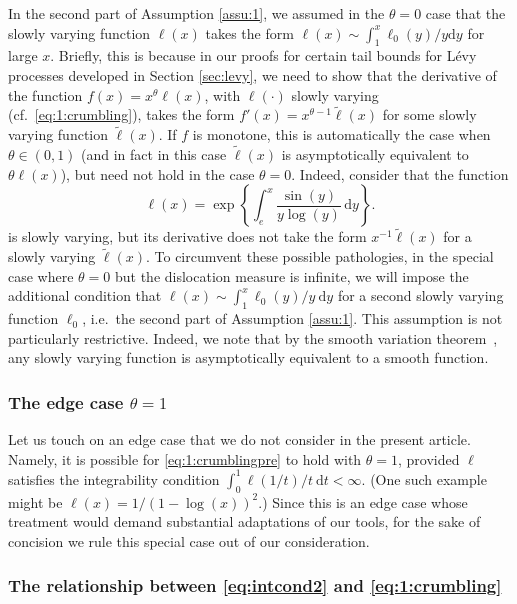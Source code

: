 \documentclass[a4,12pt]{amsart}
\numberwithin{equation}{section}
\begin{document}
    In the second part of Assumption \ref{assu:1}, we assumed in the $\theta =0$ case that the slowly varying function $\ell(x)$ takes the form $\ell(x) \sim \int_1^x \ell_0(y)/y \mathrm{d}y$ for large $x$. Briefly, this is because in our proofs for certain tail bounds for L\'evy processes developed in Section \ref{sec:levy}, we need to show that the derivative of the function $f(x) = x^\theta \ell(x)$, with $\ell(\cdot)$ slowly varying (cf.\ \eqref{eq:1:crumbling}), takes the form $f'(x) = x^{\theta-1} \tilde{\ell}(x)$ for some slowly varying function $\tilde{\ell}(x)$. If $f$ is monotone, this is automatically the case when $\theta \in (0,1)$ (and in fact in this case $\tilde{\ell}(x)$ is asymptotically equivalent to $\theta\ell(x)$), but need not hold in the case $\theta = 0$. Indeed, consider that the function  	
    \[
        \ell(x) = \exp\left\{ \int_e^x \frac{\sin(y)}{y \log(y)} \, \mathrm{d}y \right\}.
	\]
    is slowly varying, but its derivative does not take the form $x^{-1}\tilde{\ell}(x)$ for a slowly varying $\tilde{\ell}(x)$. To circumvent these possible pathologies, in the special case where $\theta = 0$ but the dislocation measure is infinite, 
	we will impose the additional condition that $\ell(x) \sim \int_1^x \ell_0(y)/y ~\mathrm{d}y$ for a second slowly varying function $\ell_0$, i.e.\ the second part of Assumption \ref{assu:1}. This assumption is not particularly restrictive. Indeed, we note that \color{black} by the smooth variation theorem~\cite[Theorem 1.3.3]{bingham1989regular}, any slowly varying function is asymptotically equivalent to a smooth function.   

\subsubsection{The edge case $\theta = 1$}

    Let us touch on an edge case that we do not consider in the present article. Namely, it is possible for 
	\eqref{eq:1:crumblingpre} to hold with $\theta = 1$, 
	provided $\ell$ satisfies the integrability condition $\int_0^1 \ell(1/t)/t~\mathrm{d}t < \infty$. (One such example might be $\ell(x) = 1/(1 - \log(x))^2$.) 
	Since this is an edge case whose treatment would demand substantial adaptations of our tools, 
	for the sake of concision we rule this special case out of our consideration. 

   
\subsubsection{The relationship between \eqref{eq:intcond2} and \eqref{eq:1:crumbling}}
\end{document}
